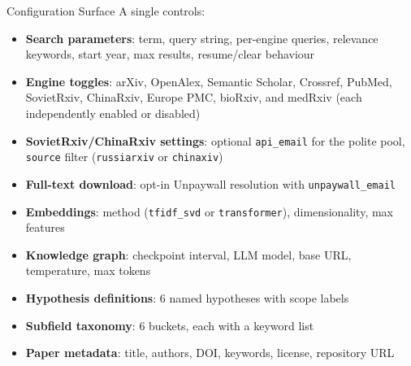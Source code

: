 \documentclass[
  ignorenonframetext,
]{beamer}
\providecommand{\tightlist}{%
  \setlength{\itemsep}{0pt}\setlength{\parskip}{0pt}}
\begin{document}
\begin{frame}{Configuration Surface}
\protect{}\label{configuration-surface}
A single  controls:

\begin{itemize}
\tightlist
\item
  \textbf{Search parameters}: term, query string, per-engine queries,
  relevance keywords, start year, max results, resume/clear behaviour
\item
  \textbf{Engine toggles}: arXiv, OpenAlex, Semantic Scholar, Crossref,
  PubMed, SovietRxiv, ChinaRxiv, Europe PMC, bioRxiv, and medRxiv (each
  independently enabled or disabled)
\item
  \textbf{SovietRxiv/ChinaRxiv settings}: optional \texttt{api\_email}
  for the polite pool, \texttt{source} filter (\texttt{russiarxiv} or
  \texttt{chinaxiv})
\item
  \textbf{Full-text download}: opt-in Unpaywall resolution with
  \texttt{unpaywall\_email}
\item
  \textbf{Embeddings}: method (\texttt{tfidf\_svd} or
  \texttt{transformer}), dimensionality, max features
\item
  \textbf{Knowledge graph}: checkpoint interval, LLM model, base URL,
  temperature, max tokens
\item
  \textbf{Hypothesis definitions}: 6 named hypotheses with scope labels
\item
  \textbf{Subfield taxonomy}: 6 buckets, each with a keyword list
\item
  \textbf{Paper metadata}: title, authors, DOI, keywords, license,
  repository URL
\end{itemize}
\end{frame}
\end{document}
